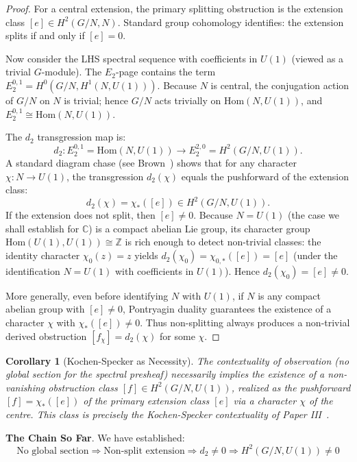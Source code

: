 \documentclass[11pt]{article}
\newtheorem{corollary}[theorem]{Corollary}
\begin{document}
\begin{proof}
For a central extension, the primary splitting obstruction is the extension class $[e] \in H^2(G/N, N)$. Standard group cohomology identifies: the extension splits if and only if $[e] = 0$.

Now consider the LHS spectral sequence with coefficients in $U(1)$ (viewed as a trivial $G$-module). The $E_2$-page contains the term $E_2^{0,1} = H^0(G/N, H^1(N, U(1)))$. Because $N$ is central, the conjugation action of $G/N$ on $N$ is trivial; hence $G/N$ acts trivially on $\mathrm{Hom}(N, U(1))$, and $E_2^{0,1} \cong \mathrm{Hom}(N, U(1))$.

The $d_2$ transgression map is:
\[
d_2: E_2^{0,1} = \mathrm{Hom}(N, U(1)) \longrightarrow E_2^{2,0} = H^2(G/N, U(1)).
\]
A standard diagram chase (see Brown~\cite[Chapter VII, \S 6]{Brown82}) shows that for any character $\chi: N \to U(1)$, the transgression $d_2(\chi)$ equals the pushforward of the extension class:
\[
d_2(\chi) = \chi_*([e]) \in H^2(G/N, U(1)).
\]
If the extension does not split, then $[e] \neq 0$. Because $N = U(1)$ (the case we shall establish for $\mathbb{C}$) is a compact abelian Lie group, its character group $\mathrm{Hom}(U(1), U(1)) \cong \mathbb{Z}$ is rich enough to detect non-trivial classes: the identity character $\chi_0(z) = z$ yields $d_2(\chi_0) = \chi_{0,*}([e]) = [e]$ (under the identification $N = U(1)$ with coefficients in $U(1)$). Hence $d_2(\chi_0) = [e] \neq 0$.

More generally, even before identifying $N$ with $U(1)$, if $N$ is any compact abelian group with $[e] \neq 0$, Pontryagin duality guarantees the existence of a character $\chi$ with $\chi_*([e]) \neq 0$. Thus non-splitting always produces a non-trivial derived obstruction $[f_\chi] = d_2(\chi)$ for some $\chi$.
\end{proof}

\begin{corollary}[Kochen-Specker as Necessity]
\label{cor:ks-necessity}
The contextuality of observation (no global section for the spectral presheaf) necessarily implies the existence of a non-vanishing obstruction class $[f] \in H^2(G/N, U(1))$, realized as the pushforward $[f] = \chi_*([e])$ of the primary extension class $[e]$ via a character $\chi$ of the centre. This class is precisely the Kochen-Specker contextuality of Paper III~\cite{PaperIII}.
\end{corollary}

\textbf{The Chain So Far}.
We have established:
\[
\boxed{\text{No global section} \Rightarrow \text{Non-split extension} \Rightarrow d_2 \neq 0 \Rightarrow H^2(G/N, U(1)) \neq 0}
\]
\end{document}
